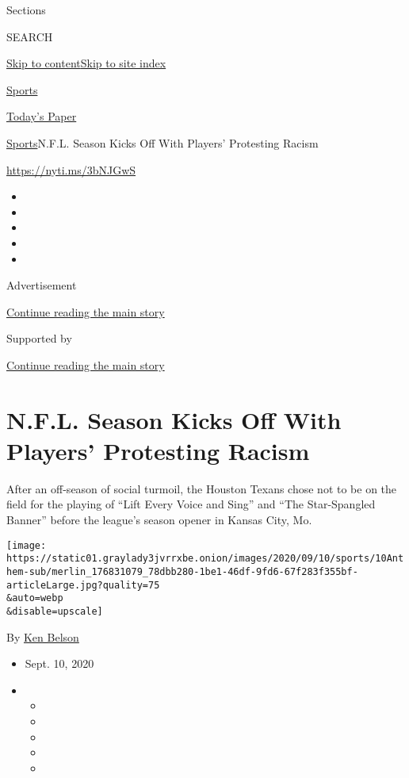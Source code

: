 Sections

SEARCH

\protect\hyperlink{site-content}{Skip to
content}\protect\hyperlink{site-index}{Skip to site index}

\href{https://www.nytimes3xbfgragh.onion/section/sports}{Sports}

\href{https://myaccount.nytimes3xbfgragh.onion/auth/login?response_type=cookie\&client_id=vi}{}

\href{https://www.nytimes3xbfgragh.onion/section/todayspaper}{Today's
Paper}

\href{/section/sports}{Sports}\textbar{}N.F.L. Season Kicks Off With
Players' Protesting Racism

\url{https://nyti.ms/3bNJGwS}

\begin{itemize}
\item
\item
\item
\item
\item
\end{itemize}

Advertisement

\protect\hyperlink{after-top}{Continue reading the main story}

Supported by

\protect\hyperlink{after-sponsor}{Continue reading the main story}

\hypertarget{nfl-season-kicks-off-with-players-protesting-racism}{%
\section{N.F.L. Season Kicks Off With Players' Protesting
Racism}\label{nfl-season-kicks-off-with-players-protesting-racism}}

After an off-season of social turmoil, the Houston Texans chose not to
be on the field for the playing of ``Lift Every Voice and Sing'' and
``The Star-Spangled Banner'' before the league's season opener in Kansas
City, Mo.

\texttt{[image: https://static01.graylady3jvrrxbe.onion/images/2020/09/10/sports/10Anthem-sub/merlin\_176831079\_78dbb280-1be1-46df-9fd6-67f283f355bf-articleLarge.jpg?quality=75\\\&auto=webp\\\&disable=upscale]}

By \href{https://www.nytimes3xbfgragh.onion/by/ken-belson}{Ken Belson}

\begin{itemize}
\item
  Sept. 10, 2020
\item
  \begin{itemize}
  \item
  \item
  \item
  \item
  \item
  \end{itemize}
\end{itemize}

